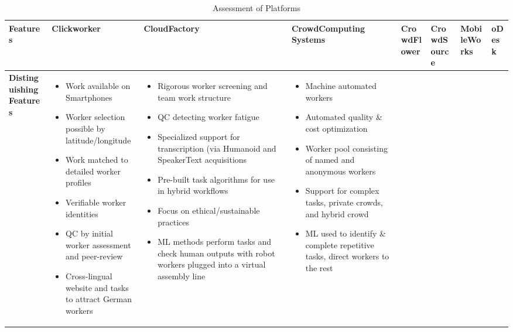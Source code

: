 \documentclass{sigchi}
\begin{document}
\begin{sidewaystable*}
\tiny
    \centering
    \caption{Assessment of Platforms}

\begin{tabular}[h]{| p{1.5cm}| p{2.7cm}| p{2.7cm}| p{2.7cm}| p{2.7cm}| p{2.7cm}| p{2.7cm}| p{2.7cm}|}
\hline
{\bf Features} & {\bf Clickworker} &{\bf CloudFactory} & {\bf CrowdComputing Systems} &{\bf CrowdFlower} &{\bf CrowdSource} &{\bf MobileWorks} &{\bf oDesk} \\ 
\hline


{\bf Distinguishing Features}  
&

{
\begin{itemize} [noitemsep,nolistsep]
\item Work available on Smartphones 
\item Worker selection possible by latitude/longitude 
\item Work matched to detailed worker profiles 
\item Verifiable worker identities 
\item QC by initial worker assessment and peer-review 
\item Cross-lingual website and tasks to attract German workers 
\end{itemize}
} & 

{ 
\begin{itemize} [noitemsep,nolistsep]
\item Rigorous worker screening and team work structure
\item QC detecting worker fatigue
\item Specialized support for transcription (via Humanoid and SpeakerText acquisitions
\item Pre-built task algorithms for use in hybrid workflows
\item Focus on ethical/sustainable practices
\item ML methods perform tasks and check human outputs with robot workers plugged into a virtual assembly line
\end{itemize}
} & 


{
\begin{itemize} [noitemsep,nolistsep]
\item Machine automated workers
\item Automated quality \& cost optimization
\item Worker pool consisting of named and anonymous workers
\item Support for complex tasks, private crowds, and hybrid crowd
\item ML used to identify \& complete repetitive tasks, direct workers to the rest
\end{itemize}
} & 


\end{tabular}
\end{sidewaystable*}
\end{document}
